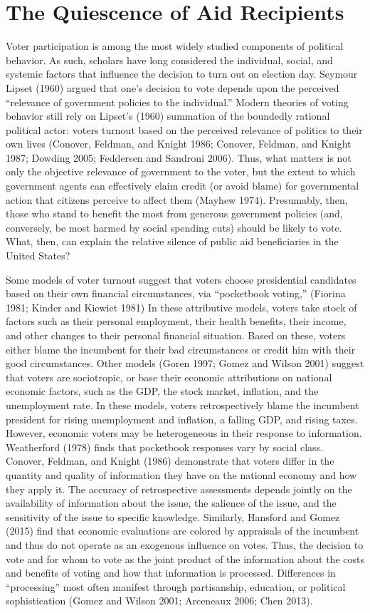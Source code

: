 \documentclass[12pt]{paper}
\begin{document}
\section{The Quiescence of Aid Recipients}
Voter participation is among the most widely studied components of political behavior. As such, scholars have long considered the individual, social, and systemic factors that influence the decision to turn out on election day. Seymour Lipset (1960) argued that one's decision to vote depends upon the perceived “relevance of government policies to the individual.” Modern theories of voting behavior still rely on Lipset’s (1960) summation of the boundedly rational political actor: voters turnout based on the perceived relevance of politics to their own lives (Conover, Feldman, and Knight 1986; Conover, Feldman, and Knight 1987; Dowding 2005; Feddersen and Sandroni 2006). Thus, what matters is not only the objective relevance of government to the voter, but the extent to which government agents can effectively claim credit (or avoid blame) for governmental action that citizens perceive to affect them (Mayhew 1974). Presumably, then, those who stand to benefit the most from generous government policies (and, conversely, be most harmed by social spending cuts) should be likely to vote. What, then, can explain the relative silence of public aid beneficiaries in the United States?

Some models of voter turnout suggest that voters choose presidential candidates based on their own financial circumstances, via ``pocketbook voting,” (Fiorina 1981; Kinder and Kiewiet 1981) In these attributive models, voters take stock of factors such as their personal employment, their health benefits, their income, and other changes to their personal financial situation. Based on these, voters either blame the incumbent for their bad circumstances or credit him with their good circumstances. Other models (Goren 1997; Gomez and Wilson 2001) suggest that voters are sociotropic, or base their economic attributions on national economic factors, such as the GDP, the stock market, inflation, and the unemployment rate. In these models, voters retrospectively blame the incumbent president for rising unemployment and inflation, a falling GDP, and rising taxes.  However, economic voters may be heterogeneous in their response to information. Weatherford (1978) finds that pocketbook responses vary by social class. Conover, Feldman, and Knight  (1986) demonstrate that voters differ in the quantity and quality of information they have on the national economy and how they apply it. The accuracy of retrospective assessments depends jointly on the availability of information about the issue, the salience of the issue, and the sensitivity of the issue to specific knowledge. Similarly, Hansford and Gomez (2015) find that economic evaluations are colored by appraisals of the incumbent and thus do not operate as an exogenous influence on votes. Thus, the decision to vote and for whom to vote as the joint product of the information about the costs and benefits of voting and how that information is processed. Differences in “processing” most often manifest through partisanship, education, or political sophistication (Gomez and Wilson 2001; Arceneaux 2006; Chen 2013). 
\end{document}
